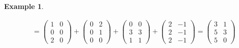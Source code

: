 \documentclass[12pt]{article}
\theoremstyle{definition}
\newtheorem{example}[theorem]{Example}
\begin{document}
\begin{example}
\begin{itemize}
\[\begin{aligned}
&=\begin{pmatrix}1&0\\0&0\\2&0\end{pmatrix}+\begin{pmatrix}0&2\\0&1\\0&0\end{pmatrix}
+\begin{pmatrix}0&0\\3&3\\1&1\end{pmatrix}+\begin{pmatrix}2&-1\\2&-1\\2&-1\end{pmatrix}
=\begin{pmatrix}3&1\\5&3\\5&0\end{pmatrix}
\end{aligned}
\]
\end{itemize}
\end{example}
\end{document}
